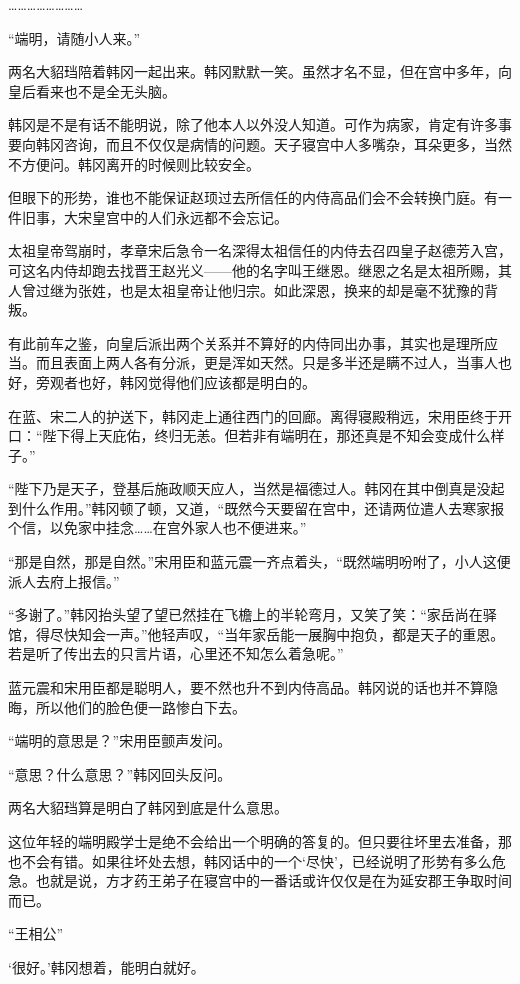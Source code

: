 ……………………

“端明，请随小人来。”

两名大貂珰陪着韩冈一起出来。韩冈默默一笑。虽然才名不显，但在宫中多年，向皇后看来也不是全无头脑。

韩冈是不是有话不能明说，除了他本人以外没人知道。可作为病家，肯定有许多事要向韩冈咨询，而且不仅仅是病情的问题。天子寝宫中人多嘴杂，耳朵更多，当然不方便问。韩冈离开的时候则比较安全。

但眼下的形势，谁也不能保证赵顼过去所信任的内侍高品们会不会转换门庭。有一件旧事，大宋皇宫中的人们永远都不会忘记。

太祖皇帝驾崩时，孝章宋后急令一名深得太祖信任的内侍去召四皇子赵德芳入宫，可这名内侍却跑去找晋王赵光义——他的名字叫王继恩。继恩之名是太祖所赐，其人曾过继为张姓，也是太祖皇帝让他归宗。如此深恩，换来的却是毫不犹豫的背叛。

有此前车之鉴，向皇后派出两个关系并不算好的内侍同出办事，其实也是理所应当。而且表面上两人各有分派，更是浑如天然。只是多半还是瞒不过人，当事人也好，旁观者也好，韩冈觉得他们应该都是明白的。

在蓝、宋二人的护送下，韩冈走上通往西门的回廊。离得寝殿稍远，宋用臣终于开口：“陛下得上天庇佑，终归无恙。但若非有端明在，那还真是不知会变成什么样子。”

“陛下乃是天子，登基后施政顺天应人，当然是福德过人。韩冈在其中倒真是没起到什么作用。”韩冈顿了顿，又道，“既然今天要留在宫中，还请两位遣人去寒家报个信，以免家中挂念……在宫外家人也不便进来。”

“那是自然，那是自然。”宋用臣和蓝元震一齐点着头，“既然端明吩咐了，小人这便派人去府上报信。”

“多谢了。”韩冈抬头望了望已然挂在飞檐上的半轮弯月，又笑了笑：“家岳尚在驿馆，得尽快知会一声。”他轻声叹，“当年家岳能一展胸中抱负，都是天子的重恩。若是听了传出去的只言片语，心里还不知怎么着急呢。”

蓝元震和宋用臣都是聪明人，要不然也升不到内侍高品。韩冈说的话也并不算隐晦，所以他们的脸色便一路惨白下去。

“端明的意思是？”宋用臣颤声发问。

“意思？什么意思？”韩冈回头反问。

两名大貂珰算是明白了韩冈到底是什么意思。

这位年轻的端明殿学士是绝不会给出一个明确的答复的。但只要往坏里去准备，那也不会有错。如果往坏处去想，韩冈话中的一个‘尽快’，已经说明了形势有多么危急。也就是说，方才药王弟子在寝宫中的一番话或许仅仅是在为延安郡王争取时间而已。

“王相公”

‘很好。’韩冈想着，能明白就好。

